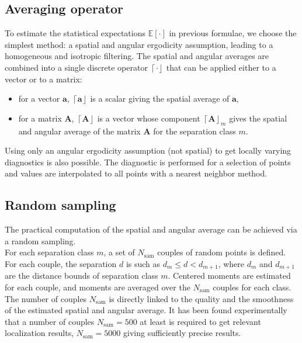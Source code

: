 \documentclass[12pt]{scrartcl}
\begin{document}
\subsection{Averaging operator}
To estimate the statistical expectations $\mathbb{E} [\cdot]$ in previous formulae, we choose the simplest method: a spatial and angular ergodicity assumption, leading to a homogeneous and isotropic filtering. The spatial and angular averages are combined into a single discrete operator $\left\lceil \cdot\right\rfloor$ that can be applied either to a vector or to a matrix:
\begin{itemize}
\item for a vector $\mathbf{a}$,  $\left\lceil \mathbf{a} \right\rfloor$ is a scalar giving the spatial average of $\mathbf{a}$,
\item for a matrix $\mathbf{A}$, $\left\lceil \mathbf{A} \right\rfloor$ is a vector whose component $\left\lceil \mathbf{A} \right\rfloor_m$ gives the spatial and angular average of the matrix $\mathbf{A}$ for the separation class $m$.
\end{itemize}
Using only an angular ergodicity assumption (not spatial) to get locally varying diagnostics is also possible. The diagnostic is performed for a selection of points and values are interpolated to all points with a nearest neighbor method.

\subsection{Random sampling}
The practical computation of the spatial and angular average can be achieved via a random sampling.\\
$  $\\
For each separation class $m$, a set of $N_\mathrm{sam}$ couples of random points is defined. For each couple, the separation $d$ is such as $d_m \le d < d_{m+1}$, where $d_m$ and $d_{m+1}$ are the distance bounds of separation class $m$. Centered moments are estimated for each couple, and moments are averaged over the $N_\mathrm{sam}$ couples for each class.\\
$  $\\
The number of couples $N_\mathrm{sam}$ is directly linked to the quality and the smoothness of the estimated spatial and angular average. It has been found experimentally that a number of couples $N_\mathrm{sam} = 500$ at least is required to get relevant localization results, $N_\mathrm{sam} = 5000$ giving sufficiently precise results.
\end{document}

